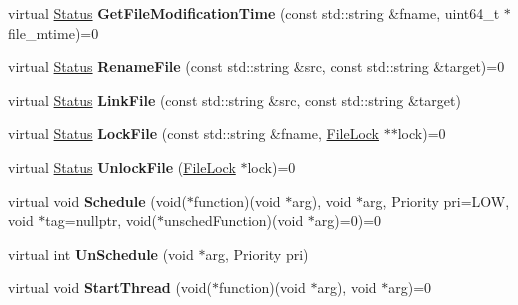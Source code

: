 \begin{DoxyCompactItemize}
\item 
virtual \hyperlink{classrocksdb_1_1Status}{Status} {\bfseries Get\+File\+Modification\+Time} (const std\+::string \&fname, uint64\+\_\+t $\ast$file\+\_\+mtime)=0\hypertarget{classrocksdb_1_1Env_a0b7781facd40158245aabf25ce686448}{}\label{classrocksdb_1_1Env_a0b7781facd40158245aabf25ce686448}

\item 
virtual \hyperlink{classrocksdb_1_1Status}{Status} {\bfseries Rename\+File} (const std\+::string \&src, const std\+::string \&target)=0\hypertarget{classrocksdb_1_1Env_a8dc0848695f4b55193ee01ffb9ad24b8}{}\label{classrocksdb_1_1Env_a8dc0848695f4b55193ee01ffb9ad24b8}

\item 
virtual \hyperlink{classrocksdb_1_1Status}{Status} {\bfseries Link\+File} (const std\+::string \&src, const std\+::string \&target)\hypertarget{classrocksdb_1_1Env_a1eeb1b9ff00c86714795f0a07a7d9572}{}\label{classrocksdb_1_1Env_a1eeb1b9ff00c86714795f0a07a7d9572}

\item 
virtual \hyperlink{classrocksdb_1_1Status}{Status} {\bfseries Lock\+File} (const std\+::string \&fname, \hyperlink{classrocksdb_1_1FileLock}{File\+Lock} $\ast$$\ast$lock)=0\hypertarget{classrocksdb_1_1Env_a680d05d86580d65e4c1cfe16dd099385}{}\label{classrocksdb_1_1Env_a680d05d86580d65e4c1cfe16dd099385}

\item 
virtual \hyperlink{classrocksdb_1_1Status}{Status} {\bfseries Unlock\+File} (\hyperlink{classrocksdb_1_1FileLock}{File\+Lock} $\ast$lock)=0\hypertarget{classrocksdb_1_1Env_a802631b298800f1ee47b75f3d8c9594d}{}\label{classrocksdb_1_1Env_a802631b298800f1ee47b75f3d8c9594d}

\item 
virtual void {\bfseries Schedule} (void($\ast$function)(void $\ast$arg), void $\ast$arg, Priority pri=L\+OW, void $\ast$tag=nullptr, void($\ast$unsched\+Function)(void $\ast$arg)=0)=0\hypertarget{classrocksdb_1_1Env_a54daee6faf4261f0e316542a1aa099fd}{}\label{classrocksdb_1_1Env_a54daee6faf4261f0e316542a1aa099fd}

\item 
virtual int {\bfseries Un\+Schedule} (void $\ast$arg, Priority pri)\hypertarget{classrocksdb_1_1Env_ad2f8ab772981aedf832123c161158c58}{}\label{classrocksdb_1_1Env_ad2f8ab772981aedf832123c161158c58}

\item 
virtual void {\bfseries Start\+Thread} (void($\ast$function)(void $\ast$arg), void $\ast$arg)=0\hypertarget{classrocksdb_1_1Env_a1f316d7bbe5cc3e9d833bd57e34c62aa}{}\label{classrocksdb_1_1Env_a1f316d7bbe5cc3e9d833bd57e34c62aa}


\end{DoxyCompactItemize}
